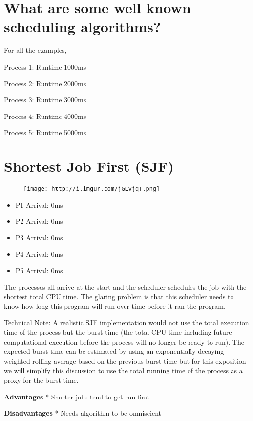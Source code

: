 \section{What are some well known scheduling
algorithms?}\label{what-are-some-well-known-scheduling-algorithms}

For all the examples,

Process 1: Runtime 1000ms

Process 2: Runtime 2000ms

Process 3: Runtime 3000ms

Process 4: Runtime 4000ms

Process 5: Runtime 5000ms

\section{Shortest Job First (SJF)}\label{shortest-job-first-sjf}

\begin{figure}[htbp]
\centering
\texttt{[image: http://i.imgur.com/jGLvjqT.png]}
\caption{}
\end{figure}

\begin{itemize}
\tightlist
\item
  P1 Arrival: 0ms
\item
  P2 Arrival: 0ms
\item
  P3 Arrival: 0ms
\item
  P4 Arrival: 0ms
\item
  P5 Arrival: 0ms
\end{itemize}

The processes all arrive at the start and the scheduler schedules the
job with the shortest total CPU time. The glaring problem is that this
scheduler needs to know how long this program will run over time before
it ran the program.

Technical Note: A realistic SJF implementation would not use the total
execution time of the process but the burst time (the total CPU time
including future computational execution before the process will no
longer be ready to run). The expected burst time can be estimated by
using an exponentially decaying weighted rolling average based on the
previous burst time but for this exposition we will simplify this
discussion to use the total running time of the process as a proxy for
the burst time.

\textbf{Advantages} * Shorter jobs tend to get run first

\textbf{Disadvantages} * Needs algorithm to be omniscient

